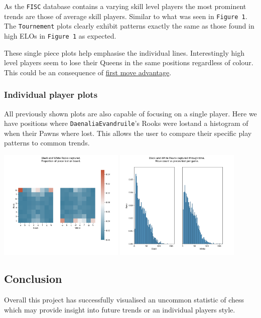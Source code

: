 \documentclass[11pt]{article}
\begin{document}
As the \texttt{FISC} database contains a varying skill level players the most prominent trends are those of average skill players. Similar to what was seen in \texttt{Figure 1}. The \texttt{Tournement} plots clearly exhibit patterns exactly the same as those found in high ELOs in \texttt{Figure 1} as expected.

These single piece plots help emphasise the individual lines. Interestingly high level players seem to lose their Queens in the same positions regardless of colour. This could be an consequence of \href{https://en.wikipedia.org/wiki/First-move\_advantage\_in\_chess}{first move advantage}.
\newpage
\subsubsection{Individual player plots}
\label{sec:orge48eb5b}
All previously shown plots are also capable of focusing on a single player. Here we have positions where \texttt{DaenaliaEvandruile}'s Rooks were lostand a histogram of when their Pawns where lost. This allows the user to compare their specific play patterns to common trends.

\begin{center}
\includegraphics[width=0.45\textwidth]{Images/DaenaliaEvandruile_HEATMAP_Rook.png}
\includegraphics[width=0.45\textwidth]{Images/DaenaliaEvandruile_HIST_Pawn.png}
\end{center}
\subsection{Conclusion}
\label{sec:orge39fbde}
Overall this project has successfully visualised an uncommon statistic of chess which may provide insight into future trends or an individual players style.
\end{document}
